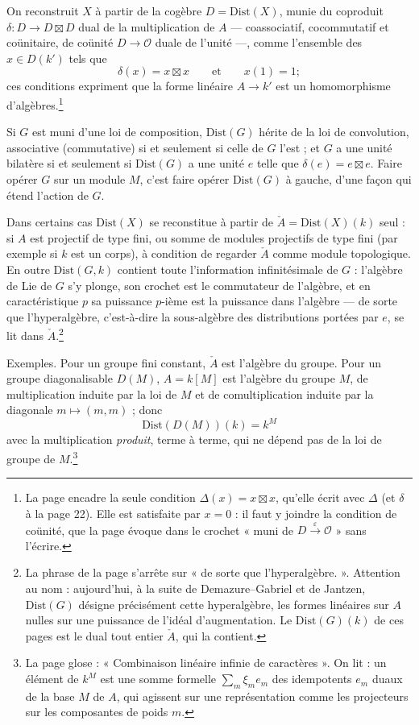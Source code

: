 \documentclass[11pt,a4paper]{article}
\begin{document}
On reconstruit $X$ à partir de la cogèbre $D = \mathrm{Dist}(X)$, munie du
coproduit $\delta \colon D \to D \boxtimes D$ dual de la multiplication de $A$
--- coassociatif, cocommutatif et coünitaire, de coünité $D \to \mathcal{O}$
duale de l'unité ---, comme l'ensemble des $x \in D(k')$ tels que
\[
  \delta(x) = x \boxtimes x \qquad \text{et} \qquad x(1) = 1 ;
\]
ces conditions expriment que la forme linéaire $A \to k'$ est un
homomorphisme d'algèbres.\footnote{La page encadre la seule condition
$\Delta(x) = x \boxtimes x$, qu'elle écrit avec $\Delta$ (et $\delta$ à la
page 22). Elle est satisfaite par $x = 0$ : il faut y joindre la condition de
coünité, que la page évoque dans le crochet « muni de
$D \xrightarrow{\varepsilon} \mathcal{O}$ » sans l'écrire.}

Si $G$ est muni d'une loi de composition, $\mathrm{Dist}(G)$ hérite de la loi
de convolution, associative (commutative) si et seulement si celle de $G$
l'est ; et $G$ a une unité bilatère si et seulement si $\mathrm{Dist}(G)$ a
une unité $e$ telle que $\delta(e) = e \boxtimes e$. Faire opérer $G$ sur un
module $M$, c'est faire opérer $\mathrm{Dist}(G)$ à gauche, d'une façon qui
étend l'action de $G$.

Dans certains cas $\mathrm{Dist}(X)$ se reconstitue à partir de
$\check{A} = \mathrm{Dist}(X)(k)$ seul : si $A$ est projectif de type fini,
ou somme de modules projectifs de type fini (par exemple si $k$ est un
corps), à condition de regarder $\check{A}$ comme module topologique. En
outre $\mathrm{Dist}(G, k)$ contient toute l'information infinitésimale de
$G$ : l'algèbre de Lie de $G$ s'y plonge, son crochet est le commutateur de
l'algèbre, et en caractéristique $p$ sa puissance $p$-ième est la puissance
dans l'algèbre --- de sorte que l'hyperalgèbre, c'est-à-dire la sous-algèbre
des distributions portées par $e$, se lit dans
$\check{A}$.\footnote{La phrase de la page s'arrête sur « de sorte que
l'hyperalgèbre. ». Attention au nom : aujourd'hui, à la suite de
Demazure--Gabriel et de Jantzen, $\mathrm{Dist}(G)$ désigne précisément
cette hyperalgèbre, les formes linéaires sur $A$ nulles sur une puissance de
l'idéal d'augmentation. Le $\mathrm{Dist}(G)(k)$ de ces pages est le dual
tout entier $\check{A}$, qui la contient.}

Exemples. Pour un groupe fini constant, $\check{A}$ est l'algèbre du groupe.
Pour un groupe diagonalisable $D(M)$, $A = k[M]$ est l'algèbre du groupe $M$,
de multiplication induite par la loi de $M$ et de comultiplication induite
par la diagonale $m \mapsto (m, m)$ ; donc
\[
  \mathrm{Dist}(D(M))(k) = k^{M}
\]
avec la multiplication \emph{produit}, terme à terme, qui ne dépend pas de la
loi de groupe de $M$.\footnote{La page glose : « Combinaison linéaire infinie
de caractères ». On lit : un élément de $k^{M}$ est une somme formelle
$\sum_{m} \xi_{m} e_{m}$ des idempotents $e_{m}$ duaux de la base $M$ de $A$,
qui agissent sur une représentation comme les projecteurs sur les
composantes de poids $m$.}
\end{document}
